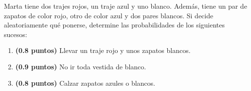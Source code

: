 
Marta tiene dos trajes rojos, un traje azul y uno blanco. Además, tiene un par de zapatos de color rojo, otro de color azul y dos pares blancos. Si decide aleatoriamente qué ponerse, determine las probabilidades de los siguientes sucesos:
\begin{enumerate}[label=\alph*)]
\item \textbf{(0.8 puntos)} Llevar un traje rojo y unos zapatos blancos.
\item \textbf{(0.9 puntos)} No ir toda vestida de blanco.
\item \textbf{(0.8 puntos)} Calzar zapatos azules o blancos.
\end{enumerate}
